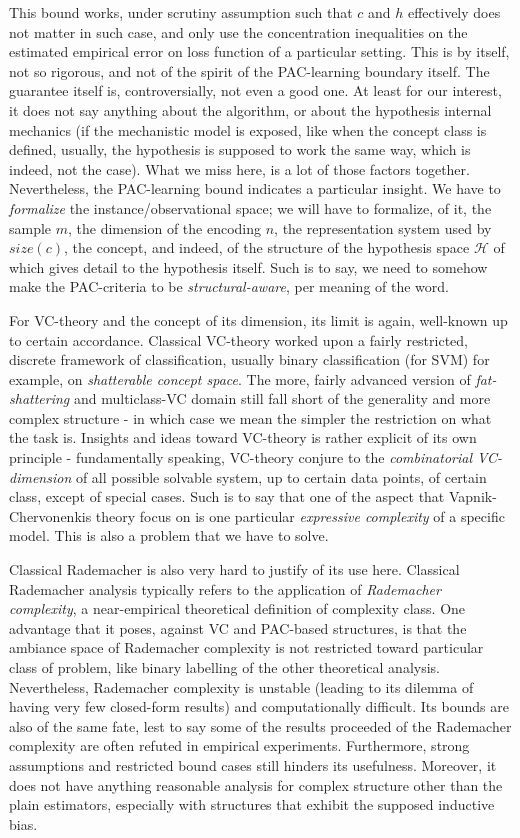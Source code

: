 \documentclass[10pt]{article} %
\begin{document}
This bound works, under scrutiny assumption such that $c$ and $h$ effectively does not matter in such case, and only use the concentration inequalities on the estimated empirical error on loss function of a particular setting. This is by itself, not so rigorous, and not of the spirit of the PAC-learning boundary itself. The guarantee itself is, controversially, not even a good one. At least for our interest, it does not say anything about the algorithm, or about the hypothesis internal mechanics (if the mechanistic model is exposed, like when the concept class is defined, usually, the hypothesis is supposed to work the same way, which is indeed, not the case). What we miss here, is a lot of those factors together. Nevertheless, the PAC-learning bound indicates a particular insight. We have to \textit{formalize} the instance/observational space; we will have to formalize, of it, the sample $m$, the dimension of the encoding $n$, the representation system used by $size(c)$, the concept, and indeed, of the structure of the hypothesis space $\mathcal{H}$ of which gives detail to the hypothesis itself. Such is to say, we need to somehow make the PAC-criteria to be \textit{structural-aware}, per meaning of the word. 

For VC-theory and the concept of its dimension, its limit is again, well-known up to certain accordance. Classical VC-theory worked upon a fairly restricted, discrete framework of classification, usually binary classification (for SVM) for example, on \textit{shatterable concept space}. The more, fairly advanced version of \textit{fat-shattering} and multiclass-VC domain still fall short of the generality and more complex structure - in which case we mean the simpler the restriction on what the task is. Insights and ideas toward VC-theory is rather explicit of its own principle - fundamentally speaking, VC-theory conjure to the \textit{combinatorial VC-dimension} of all possible solvable system, up to certain data points, of certain class, except of special cases. Such is to say that one of the aspect that Vapnik-Chervonenkis theory focus on is one particular \textit{expressive complexity} of a specific model. This is also a problem that we have to solve. 

Classical Rademacher is also very hard to justify of its use here. Classical Rademacher analysis typically refers to the application of \textit{Rademacher complexity}, a near-empirical theoretical definition of complexity class. One advantage that it poses, against VC and PAC-based structures, is that the ambiance space of Rademacher complexity is not restricted toward particular class of problem, like binary labelling of the other theoretical analysis. Nevertheless, Rademacher complexity is unstable (leading to its dilemma of having very few closed-form results) and computationally difficult. Its bounds are also of the same fate, lest to say some of the results proceeded of the Rademacher complexity are often refuted in empirical experiments. Furthermore, strong assumptions and restricted bound cases still hinders its usefulness. Moreover, it does not have anything reasonable analysis for complex structure other than the plain estimators, especially with structures that exhibit the supposed inductive bias. 
\end{document}
